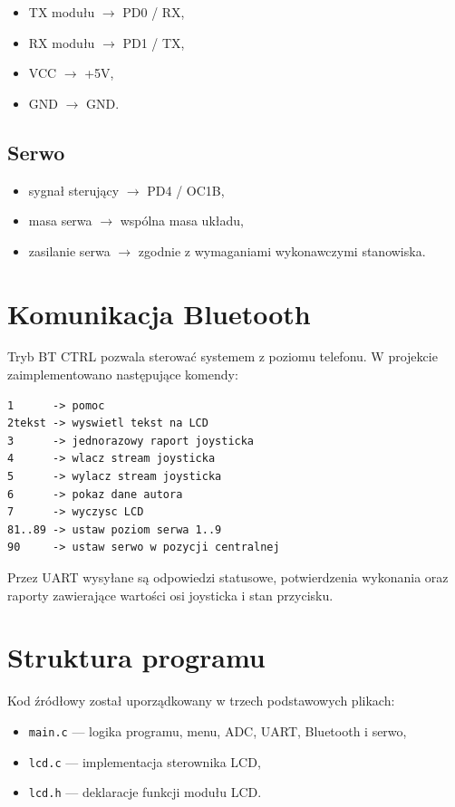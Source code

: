 \documentclass[a4paper,12pt]{article}
\begin{document}
\begin{itemize}[leftmargin=1.2cm]
    \item TX modułu $\rightarrow$ PD0 / RX,
    \item RX modułu $\rightarrow$ PD1 / TX,
    \item VCC $\rightarrow$ +5V,
    \item GND $\rightarrow$ GND.
\end{itemize}

\subsection{Serwo}

\begin{itemize}[leftmargin=1.2cm]
    \item sygnał sterujący $\rightarrow$ PD4 / OC1B,
    \item masa serwa $\rightarrow$ wspólna masa układu,
    \item zasilanie serwa $\rightarrow$ zgodnie z wymaganiami wykonawczymi stanowiska.
\end{itemize}

\section{Komunikacja Bluetooth}

Tryb BT CTRL pozwala sterować systemem z poziomu telefonu. W projekcie zaimplementowano następujące komendy:

\begin{lstlisting}[style=CStyle,caption={Komendy obslugiwane przez aplikacje}]
1      -> pomoc
2tekst -> wyswietl tekst na LCD
3      -> jednorazowy raport joysticka
4      -> wlacz stream joysticka
5      -> wylacz stream joysticka
6      -> pokaz dane autora
7      -> wyczysc LCD
81..89 -> ustaw poziom serwa 1..9
90     -> ustaw serwo w pozycji centralnej
\end{lstlisting}

Przez UART wysyłane są odpowiedzi statusowe, potwierdzenia wykonania oraz raporty zawierające wartości osi joysticka i stan przycisku.

\section{Struktura programu}

Kod źródłowy został uporządkowany w trzech podstawowych plikach:

\begin{itemize}[leftmargin=1.2cm]
    \item \texttt{main.c} --- logika programu, menu, ADC, UART, Bluetooth i serwo,
    \item \texttt{lcd.c} --- implementacja sterownika LCD,
    \item \texttt{lcd.h} --- deklaracje funkcji modułu LCD.
\end{itemize}
\end{document}
